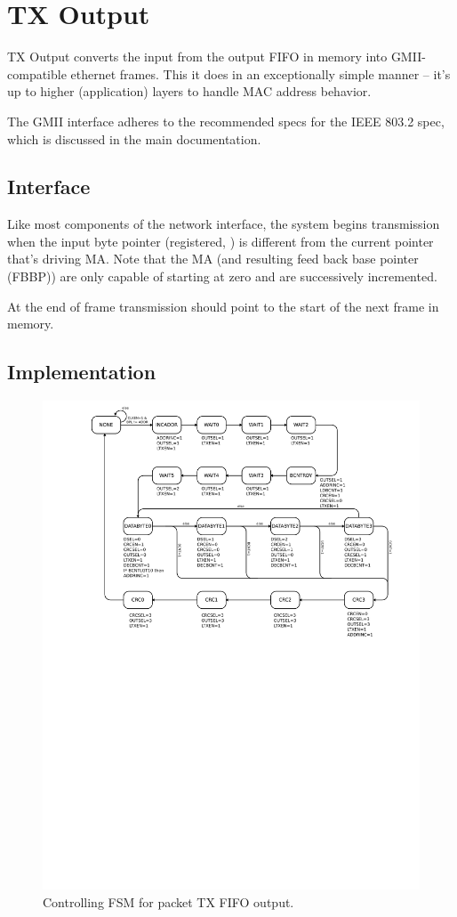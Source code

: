 
\section{TX Output}

TX Output converts the input from the output FIFO in memory into
GMII-compatible ethernet frames. This it does in an exceptionally
simple manner -- it's up to higher (application) layers to handle MAC
address behavior.

The GMII interface adheres to the recommended specs for the IEEE 803.2
spec, which is discussed in the main documentation. 

\subsection{Interface}
Like most components of the network interface, the system begins
transmission when the input byte pointer (registered, ) is
different from the current pointer that's driving MA. Note that the MA
(and resulting feed back base pointer (FBBP)) are only capable of
starting at zero and are successively incremented.

At the end of frame transmission  should point to the
start of the next frame in memory.

\subsection{Implementation}
\begin{figure}
\label{txoutputfsm}
\includegraphics[scale=0.7]{txoutput.fsm.svg}
\caption{Controlling FSM for packet TX FIFO output.}
\end{figure}

